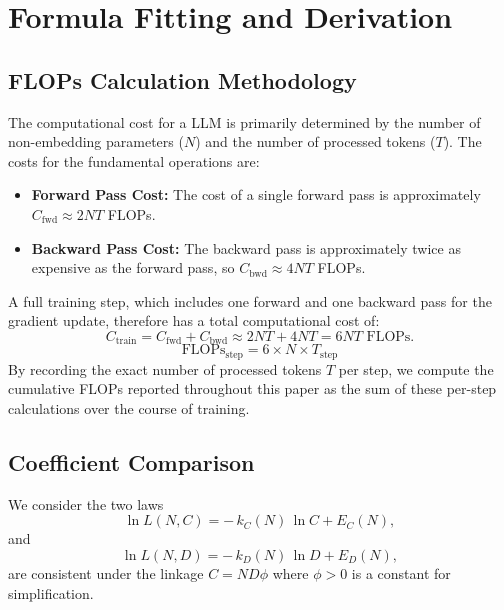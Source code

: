 \section{Formula Fitting and Derivation}
\subsection{FLOPs Calculation Methodology}
\label{app:flops_calculation}
The computational cost for a LLM is primarily determined by the number of non-embedding parameters ($N$) and the number of processed tokens ($T$). The costs for the fundamental operations are:
\begin{itemize}
    \item \textbf{Forward Pass Cost:} The cost of a single forward pass is approximately $C_{\text{fwd}} \approx 2NT$ FLOPs.
    \item \textbf{Backward Pass Cost:} The backward pass is approximately twice as expensive as the forward pass, so $C_{\text{bwd}} \approx 4NT$ FLOPs.
\end{itemize}
A full training step, which includes one forward and one backward pass for the gradient update, therefore has a total computational cost of:
\begin{equation}
    C_{\text{train}} = C_{\text{fwd}} + C_{\text{bwd}} \approx 2NT + 4NT = 6NT \text{ FLOPs.}
\end{equation}
\begin{equation}
    \text{FLOPs}_{\text{step}} = 6 \times N \times T_{\text{step}}
\end{equation}
By recording the exact number of processed tokens $T$ per step, we compute the cumulative FLOPs reported throughout this paper as the sum of these per-step calculations over the course of training.

\subsection{Coefficient Comparison}
\label{app:coeff_comparison}
We consider the two laws
\begin{equation}
    \ln L(N, C) = -\,k_C(N)\,\ln C + E_{C}(N),
    \label{eq:compute_law_app}
\end{equation}
and
\begin{equation}
    \ln L(N, D) = -\,k_D(N)\,\ln D + E_{D}(N),
    \label{eq:data_law_app}
\end{equation}
are consistent under the linkage \(C = N D \phi\) where \(\phi>0\) is a constant for simplification.

